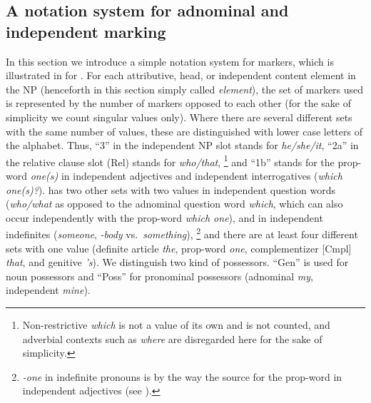 \documentclass[output=collectionpaper]{langsci/langscibook}
\begin{document}
  \subsection{A notation system for adnominal and independent marking}

In this section we introduce a simple notation system for markers, which is illustrated in  for . For each attributive, head, or independent content element in the NP (henceforth in this section simply called \textit{element}), the set of markers used is represented by the number of markers opposed to each other (for the sake of simplicity we count singular values only). Where there are several different sets with the same number of values, these are distinguished with lower case letters of the alphabet. Thus, ``3'' in the  independent NP slot stands for \textit{he/she/it}, ``2a'' in the relative clause slot (Rel) stands for \textit{who/that},%
\footnote{
Non-restrictive \textit{which} is not a value of its own and is not counted, and adverbial contexts such as \textit{where} are disregarded here for the sake of simplicity.
} %
and ``1b'' stands for the prop-word \textit{one(s)} in independent adjectives and independent interrogatives (\textit{which one(s)?}).  has two other sets with two values in independent question words (\textit{who/what} as opposed to the adnominal question word \textit{which}, which can also occur independently with the prop-word \textit{which one}), and in independent indefinites (\textit{someone}, \textit{-body} vs.\ \textit{something}),%
\footnote{
\textit{-one} in indefinite pronouns is by the way the source for the prop-word in independent adjectives (see \citealt{Rissanen1997}).
} %
and there are at least four different sets with one value (definite article \textit{the}, prop-word \textit{one}, complementizer [Cmpl] \textit{that}, and genitive \textit{'s}). We distinguish two kind of possessors. ``Gen'' is used for noun possessors and ``Poss'' for pronominal possessors (adnominal \textit{my}, independent \textit{mine}).

\begin{table}
\caption{English nominal morphology. 1a: \textit{the} (indefinite \textit{a/an}), 3: \textit{he/she/it}, 1b: \textit{one(s)}, 2a: (\textit{he/she}) \textit{who/that}, \textit{which}, 1c \textit{that}, 1d \textit{'s}, \textit{mine}, 2b \textit{who/what}, 2c \textit{-one},\textit{-body}/\textit{-thing}.\label{tab:WDG:1}}
\end{table}
\end{document}
